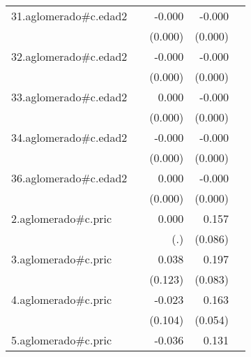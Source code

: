 {\begin{longtable}{l*{4}{D{.}{.}{-1}}}
\addlinespace
31.aglomerado#c.edad2&                     &      -0.000         &      -0.000\sym{***}&                     \\
            &                     &     (0.000)         &     (0.000)         &                     \\
\addlinespace
32.aglomerado#c.edad2&                     &      -0.000         &      -0.000\sym{***}&                     \\
            &                     &     (0.000)         &     (0.000)         &                     \\
\addlinespace
33.aglomerado#c.edad2&                     &       0.000         &      -0.000\sym{***}&                     \\
            &                     &     (0.000)         &     (0.000)         &                     \\
\addlinespace
34.aglomerado#c.edad2&                     &      -0.000         &      -0.000\sym{***}&                     \\
            &                     &     (0.000)         &     (0.000)         &                     \\
\addlinespace
36.aglomerado#c.edad2&                     &       0.000         &      -0.000         &                     \\
            &                     &     (0.000)         &     (0.000)         &                     \\
\addlinespace
2.aglomerado#c.pric&                     &       0.000         &       0.157         &                     \\
            &                     &         (.)         &     (0.086)         &                     \\
\addlinespace
3.aglomerado#c.pric&                     &       0.038         &       0.197\sym{*}  &                     \\
            &                     &     (0.123)         &     (0.083)         &                     \\
\addlinespace
4.aglomerado#c.pric&                     &      -0.023         &       0.163\sym{**} &                     \\
            &                     &     (0.104)         &     (0.054)         &                     \\
\addlinespace
5.aglomerado#c.pric&                     &      -0.036         &       0.131         &                     \\

\end{longtable}}
